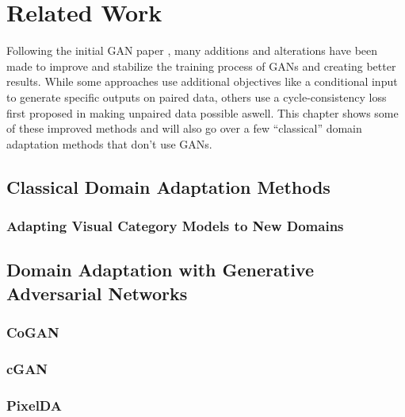 \chapter{Related Work}
\label{sec:related_work}
Following the initial GAN paper \cite{NIPS2014_5423}, many additions and alterations have been made to improve and stabilize the training process of GANs and creating better results. While some approaches use additional objectives like a conditional input to generate specific outputs \cite{DBLP:journals/corr/IsolaZZE16} on paired data, others use a cycle-consistency loss first proposed in \cite{DBLP:journals/corr/ZhuPIE17} making unpaired data possible aswell. This chapter shows some of these improved methods and will also go over a few ``classical'' domain adaptation methods that don't use GANs.

\section{Classical Domain Adaptation Methods}

\subsection{Adapting Visual Category Models to New Domains}
\cite{10.1007/978-3-642-15561-1_16}



\section{Domain Adaptation with Generative Adversarial Networks}



\subsection{CoGAN}
\cite{DBLP:journals/corr/0001T16}

\subsection{cGAN}
\cite{DBLP:journals/corr/IsolaZZE16}

\subsection{PixelDA}
\cite{DBLP:journals/corr/BousmalisSDEK16}